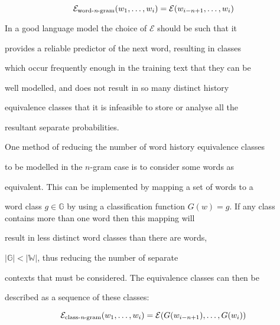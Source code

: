 \begin{equation}


\mathcal E_{\textrm{word-{\it n}-gram}}(w_1, \ldots, w_{i}) = \mathcal E(w_{i-n+1}, \ldots, w_{i})


\end{equation}





In a good language model the choice of $\mathcal{E}$ should be such that it


provides a reliable predictor of the next word, resulting in classes


which occur frequently enough in the training text that they can be


well modelled, and does not result in so many distinct history


equivalence classes that it is infeasible to store or analyse all the


resultant separate probabilities.








\label{classngram-description}


One method of reducing the number of word history equivalence classes


to be modelled in the $n$-gram case is to consider some words as


equivalent. This can be implemented by mapping a set of words to a


word class $g \in \mathbb{G}$ by using a classification function $G(w)


= g$. If any class contains more than one word then this mapping will


result in less distinct word classes than there are words,


$|\mathbb{G}| < |\mathbb{W}|$, thus reducing the number of separate


contexts that must be considered. The equivalence classes can then be


described as a sequence of these classes:


\begin{equation}


\mathcal E_{\textrm{class-{\it n}-gram}}(w_1, \ldots, w_{i}) = \mathcal


E(G(w_{i-n+1}), \ldots, G(w_{i}))\label{equiv_classes}


\end{equation}





